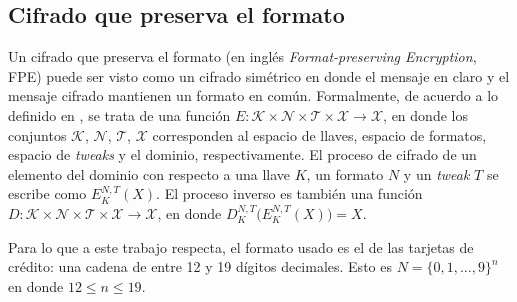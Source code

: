 \subsection{Cifrado que preserva el formato}



Un cifrado que preserva el formato (en inglés \textit{Format-preserving
Encryption}, FPE) puede ser visto como un cifrado simétrico en donde el mensaje
en claro y el mensaje cifrado mantienen un formato en común. Formalmente, de
acuerdo a lo definido en \cite{DBLP:conf/sacrypt/BellareRRS09}, se trata de una
función $ E: \mathcal{K} \times \mathcal{N} \times \mathcal{T} \times
\mathcal{X} \rightarrow \mathcal{X} $, en donde los conjuntos $ \mathcal{K} $, $
\mathcal{N} $, $ \mathcal{T} $, $ \mathcal{X} $ corresponden al espacio de
llaves, espacio de formatos, espacio de \textit{tweaks} y el dominio,
respectivamente. El proceso de cifrado de un elemento del dominio con respecto a
una llave $ K $, un formato $ N $ y un \textit{tweak} $ T $ se escribe como  $
E_K^{N,T}(X) $. El proceso inverso es también una función $ D: \mathcal{K}
\times \mathcal{N} \times \mathcal{T} \times \mathcal{X} \rightarrow \mathcal{X}
$, en donde $ D_K^{N,T}\big( E_K^{N,T}(X) \big) = X $.


Para lo que a este trabajo respecta, el formato usado es el de las tarjetas de
crédito: una cadena de entre 12 y 19 dígitos decimales. Esto es $ N = \{0, 1,
\dots, 9\}^n $ en donde $ 12 \leq n \leq 19 $.



